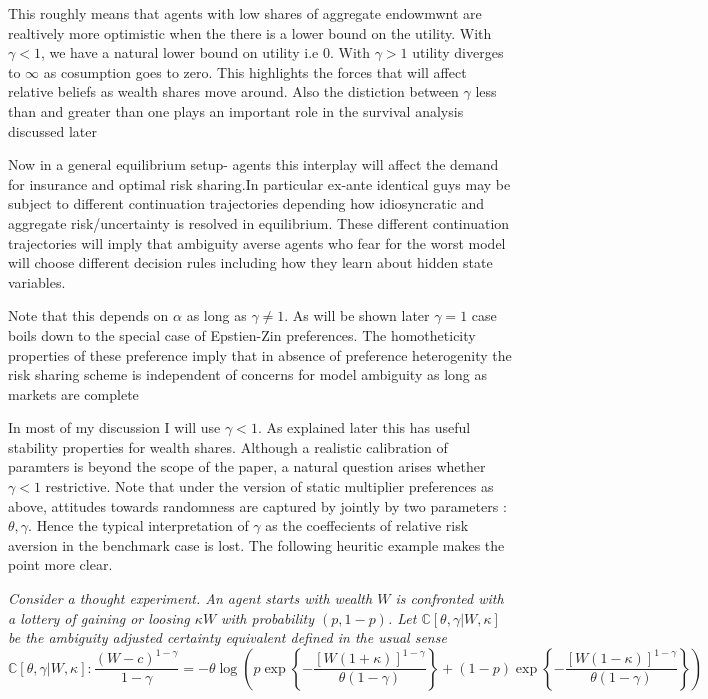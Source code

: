 \documentclass[12pt]{article}
\begin{document}
\noindent  This roughly means that agents with low shares of aggregate endowmwnt are realtively more optimistic when the there is a lower bound on the utility. With $\gamma < 1$, we have a natural lower bound on utility i.e 0. With $\gamma > 1$ utility diverges to $\infty$ as cosumption goes to zero. This highlights the forces that will affect relative beliefs as wealth shares move around. Also the distiction between $\gamma$ less than and greater than one plays an important role in the survival analysis discussed later

\vspace{10 mm}
\noindent Now in a general equilibrium setup- agents this interplay will affect the demand for insurance and optimal risk sharing.In particular ex-ante identical guys may be subject to different continuation trajectories depending how idiosyncratic and aggregate risk/uncertainty is resolved in equilibrium. These different continuation trajectories will imply that ambiguity averse agents who fear for the worst model will choose different decision rules including how they learn about hidden state variables.

Note that this depends on $\alpha$ as long as $\gamma\neq 1$. As will be shown later $\gamma=1$ case boils down to the special case of Epstien-Zin preferences. The homotheticity properties of these preference imply that in absence of preference heterogenity the risk sharing scheme is independent of concerns for model ambiguity as long as markets are complete



\noindent In most of my discussion I will use $\gamma < 1$. As explained later this has useful stability properties for wealth shares. Although a realistic calibration of paramters is beyond the scope of the paper, a natural question arises whether $\gamma < 1$ restrictive. Note that under the version of static multiplier preferences as above, attitudes towards randomness are captured by jointly by two parameters : $\theta, \gamma$. Hence the typical interpretation of $\gamma$ as the coeffecients of relative risk aversion in the benchmark case is lost. The following heuritic example makes the point more clear. 

\noindent \emph{Consider a thought experiment. An agent starts with wealth $W$ is confronted with a lottery of gaining or loosing $\kappa W$ with probability $(p,1-p)$. Let $\mathbb{C}[\theta,\gamma|W,\kappa]$ be the ambiguity adjusted certainty equivalent defined in the usual sense}
\[
\mathbb{C}[\theta,\gamma|W,\kappa] : \frac { (W-c)^{1-\gamma} } {1-\gamma}=
-\theta \log
\left(
p \exp\left \{-\frac {[W(1+\kappa)]^{1-\gamma}}  {\theta (1-\gamma)} \right \}
+(1-p)\exp \left \{-\frac {[W(1-\kappa)]^{1-\gamma}} {\theta (1-\gamma)} \right\} \right)\]
\end{document}
